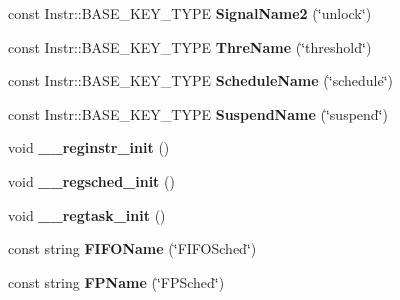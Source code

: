 \begin{DoxyCompactItemize}
\item 
const Instr\+::\+B\+A\+S\+E\+\_\+\+K\+E\+Y\+\_\+\+T\+Y\+PE {\bfseries Signal\+Name2} (\char`\"{}unlock\char`\"{})\hypertarget{namespaceRTSim_a731a8582eea66b9351585fb17f870444}{}\label{namespaceRTSim_a731a8582eea66b9351585fb17f870444}

\item 
const Instr\+::\+B\+A\+S\+E\+\_\+\+K\+E\+Y\+\_\+\+T\+Y\+PE {\bfseries Thre\+Name} (\char`\"{}threshold\char`\"{})\hypertarget{namespaceRTSim_a130c9a64dad2912adb56443b0170e5d1}{}\label{namespaceRTSim_a130c9a64dad2912adb56443b0170e5d1}

\item 
const Instr\+::\+B\+A\+S\+E\+\_\+\+K\+E\+Y\+\_\+\+T\+Y\+PE {\bfseries Schedule\+Name} (\char`\"{}schedule\char`\"{})\hypertarget{namespaceRTSim_a54bc1a63e791c76700ab057c8ba74752}{}\label{namespaceRTSim_a54bc1a63e791c76700ab057c8ba74752}

\item 
const Instr\+::\+B\+A\+S\+E\+\_\+\+K\+E\+Y\+\_\+\+T\+Y\+PE {\bfseries Suspend\+Name} (\char`\"{}suspend\char`\"{})\hypertarget{namespaceRTSim_a7e32d1281bfdfb254b24d36db6d33ff0}{}\label{namespaceRTSim_a7e32d1281bfdfb254b24d36db6d33ff0}

\item 
void {\bfseries \+\_\+\+\_\+reginstr\+\_\+init} ()\hypertarget{namespaceRTSim_a8544ffd94890acbade1ac63409eed5ab}{}\label{namespaceRTSim_a8544ffd94890acbade1ac63409eed5ab}

\item 
void {\bfseries \+\_\+\+\_\+regsched\+\_\+init} ()\hypertarget{namespaceRTSim_a650f8dc80831afff987257139a533662}{}\label{namespaceRTSim_a650f8dc80831afff987257139a533662}

\item 
void {\bfseries \+\_\+\+\_\+regtask\+\_\+init} ()\hypertarget{namespaceRTSim_a70de6b24978e56ba1fc05fc3ee92a1eb}{}\label{namespaceRTSim_a70de6b24978e56ba1fc05fc3ee92a1eb}

\item 
const string {\bfseries F\+I\+F\+O\+Name} (\char`\"{}F\+I\+F\+O\+Sched\char`\"{})\hypertarget{namespaceRTSim_a186bcc8cd55b50f1b5ef60a25033b540}{}\label{namespaceRTSim_a186bcc8cd55b50f1b5ef60a25033b540}

\item 
const string {\bfseries F\+P\+Name} (\char`\"{}F\+P\+Sched\char`\"{})\hypertarget{namespaceRTSim_aa73e1a05392d77d282252acc7fc67812}{}\label{namespaceRTSim_aa73e1a05392d77d282252acc7fc67812}


\end{DoxyCompactItemize}
